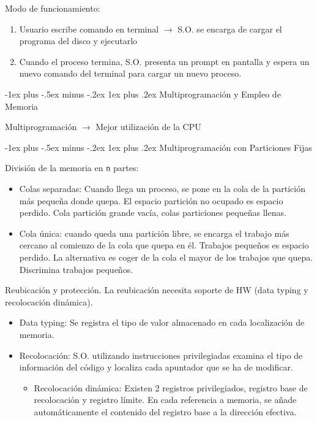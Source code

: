 \documentclass[10pt,portrait, twocolumn]{article}
\makeatletter
\renewcommand{\subsubsection}{\@startsection{subsubsection}{3}{0mm}%
                                {-1ex plus -.5ex minus -.2ex}%
                                {1ex plus .2ex}%
                                {\normalfont\small\bfseries}}
\makeatother
\begin{document}
Modo de funcionamiento:

	\begin{enumerate}
	\item Usuario escribe comando en terminal $\rightarrow$ S.O. se encarga de cargar el programa del disco y ejecutarlo
	\item Cuando el proceso termina, S.O. presenta un prompt en pantalla y espera un nuevo comando del terminal para cargar un nuevo proceso.
	\end{enumerate}
	
\subsubsection{Multiprogramación y Empleo de Memoria}

\begin{center}
Multiprogramación $\rightarrow$ Mejor utilización de la CPU
\end{center}


\subsubsection{Multiprogramación con Particiones Fijas}

División de la memoria en \texttt{n} partes:

	\begin{itemize}
	\item Colas separadas: Cuando llega un proceso, se pone en la cola de la partición más pequeña donde quepa. El espacio partición no ocupado es espacio perdido. Cola partición grande vacía, colas particiones pequeñas llenas.
	\item Cola única: cuando queda una partición libre, se encarga el trabajo más cercano al comienzo de la cola que quepa en él. Trabajos pequeños es espacio perdido. La alternativa es coger de la cola el mayor de los trabajos que quepa. Discrimina trabajos pequeños.
	\end{itemize}
	
Reubicación y protección. La reubicación necesita soporte de HW (data typing y recolocación dinámica).

	\begin{itemize}
	\item Data typing: Se registra el tipo de valor almacenado en cada localización de memoria.
	\item Recolocación: S.O. utilizando instrucciones privilegiadas examina el tipo de información del código y localiza cada apuntador que se ha de modificar.
		\begin{itemize}
		\item Recolocación dinámica: Existen 2 registros privilegiados, registro base de recolocación y registro límite. En cada referencia a memoria, se añade automáticamente el contenido del registro base a la dirección efectiva.
		\end{itemize}
	\end{itemize}
\end{document}
